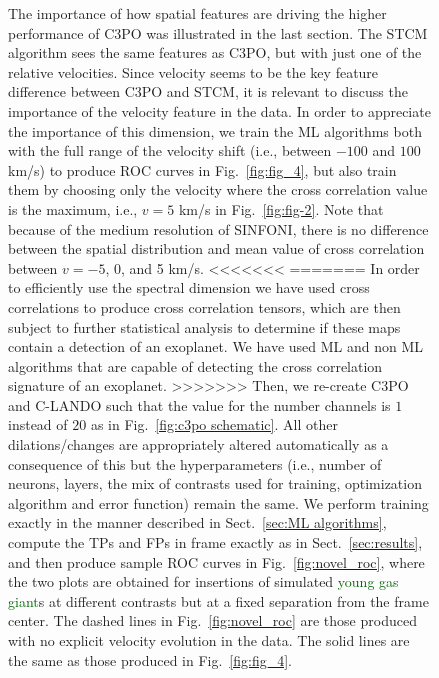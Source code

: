 \documentclass{aa}
\newcommand{\newchange}[1]{\textcolor{darkgreen}{#1}}
\begin{document}
{{{\begin{figure}
{The importance of how spatial features are driving the higher performance of C3PO was illustrated in the last section. The STCM algorithm sees the same features as C3PO, but with just one of the relative velocities.
Since velocity seems to be the key feature difference between C3PO and STCM, it is relevant to discuss the importance of the velocity feature in the data. 
In order to appreciate the importance of this dimension, we train the ML algorithms both with the full range of the velocity shift (i.e., between $-100$ and $100$ km/s) to produce ROC curves in Fig.~\ref{fig:fig_4}, but also train them by choosing only the velocity where the cross correlation value is the maximum, i.e., $v=5$ km/s in Fig.~\ref{fig:fig-2}.
Note that because of the medium resolution of SINFONI, there is no difference between the spatial distribution and mean value of cross correlation between $v=-5$, 0, and 5 km/s. 
<<<<<<<
=======
In order to efficiently use the spectral dimension we have used cross correlations to produce cross correlation tensors, which are then subject to further statistical analysis to determine if these maps contain a detection of an exoplanet.
We have used ML and non ML algorithms that are capable of detecting the cross correlation signature of an exoplanet. %
>>>>>>>
Then, we re-create C3PO and C-LANDO such that the value for the number channels is $1$ instead of $20$ as in Fig.~\ref{fig:c3po schematic}.
All other dilations/changes are appropriately altered automatically as a consequence of this but the hyperparameters (i.e., number of neurons, layers, the mix of contrasts used for training, optimization algorithm and error function) remain the same.
We perform training exactly in the manner described in Sect.~\ref{sec:ML algorithms}, compute the TPs and FPs in frame exactly as in Sect.~\ref{sec:results}, and then produce sample ROC curves in Fig.~\ref{fig:novel_roc}, where the two plots are obtained for insertions of simulated \newchange{young gas giant}s at different contrasts but at a fixed separation from the frame center.
The dashed lines in Fig.~\ref{fig:novel_roc} are those produced with no explicit velocity evolution in the data.
The solid lines are the same as those produced in Fig.~\ref{fig:fig_4}.

}
\end{figure}}}}
\end{document}
